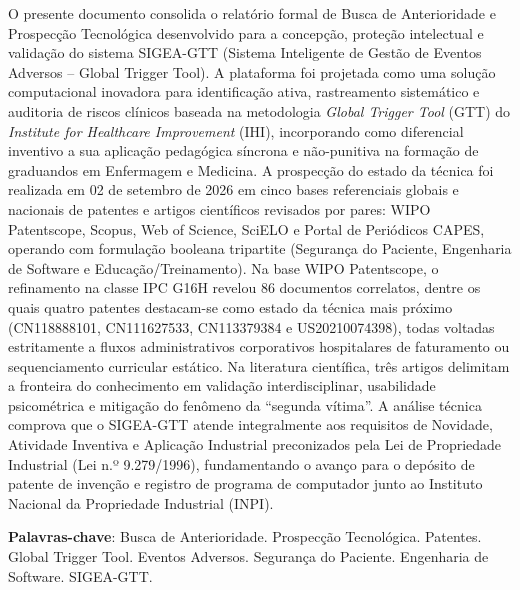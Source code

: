 \begin{resumo}
O presente documento consolida o relatório formal de Busca de Anterioridade e Prospecção Tecnológica desenvolvido para a concepção, proteção intelectual e validação do sistema SIGEA-GTT (Sistema Inteligente de Gestão de Eventos Adversos -- Global Trigger Tool). A plataforma foi projetada como uma solução computacional inovadora para identificação ativa, rastreamento sistemático e auditoria de riscos clínicos baseada na metodologia \textit{Global Trigger Tool} (GTT) do \textit{Institute for Healthcare Improvement} (IHI), incorporando como diferencial inventivo a sua aplicação pedagógica síncrona e não-punitiva na formação de graduandos em Enfermagem e Medicina. A prospecção do estado da técnica foi realizada em 02 de setembro de 2026 em cinco bases referenciais globais e nacionais de patentes e artigos científicos revisados por pares: WIPO Patentscope, Scopus, Web of Science, SciELO e Portal de Periódicos CAPES, operando com formulação booleana tripartite (Segurança do Paciente, Engenharia de Software e Educação/Treinamento). Na base WIPO Patentscope, o refinamento na classe IPC G16H revelou 86 documentos correlatos, dentre os quais quatro patentes destacam-se como estado da técnica mais próximo (CN118888101, CN111627533, CN113379384 e US20210074398), todas voltadas estritamente a fluxos administrativos corporativos hospitalares de faturamento ou sequenciamento curricular estático. Na literatura científica, três artigos delimitam a fronteira do conhecimento em validação interdisciplinar, usabilidade psicométrica e mitigação do fenômeno da ``segunda vítima''. A análise técnica comprova que o SIGEA-GTT atende integralmente aos requisitos de Novidade, Atividade Inventiva e Aplicação Industrial preconizados pela Lei de Propriedade Industrial (Lei n.º 9.279/1996), fundamentando o avanço para o depósito de patente de invenção e registro de programa de computador junto ao Instituto Nacional da Propriedade Industrial (INPI).

\textbf{Palavras-chave}: Busca de Anterioridade. Prospecção Tecnológica. Patentes. Global Trigger Tool. Eventos Adversos. Segurança do Paciente. Engenharia de Software. SIGEA-GTT.
\end{resumo}
